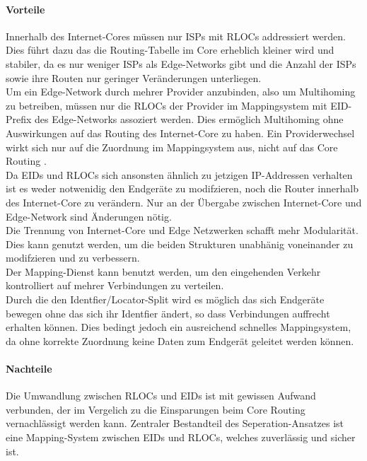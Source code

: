 \paragraph{Vorteile}
Innerhalb des Internet-Cores müssen nur ISPs mit RLOCs addressiert werden. Dies führt dazu das die Routing-Tabelle im Core erheblich kleiner wird und stabiler, da es nur weniger ISPs als Edge-Networks gibt und die Anzahl der ISPs sowie ihre Routen nur geringer Veränderungen unterliegen. \cite{jen:2008:start} \cite{deering:1996:map} \\
Um ein Edge-Network durch mehrer Provider anzubinden, also um Multihoming zu betreiben, müssen nur die RLOCs der Provider im Mappingsystem mit EID-Prefix des Edge-Networks assoziert werden. Dies ermöglich Multihoming ohne Auswirkungen auf das Routing des Internet-Core zu haben. Ein Providerwechsel wirkt sich nur auf die Zuordnung im  Mappingsystem aus, nicht auf das Core Routing \cite{farinacci2007internet}.\\
Da EIDs und RLOCs sich ansonsten ähnlich zu jetzigen IP-Addressen verhalten ist es weder notwenidig den Endgeräte zu modifzieren, noch die Router innerhalb des Internet-Core zu verändern. Nur an der Übergabe zwischen Internet-Core und Edge-Network sind Änderungen nötig. \cite{jen:2008:start} \\
Die Trennung von Internet-Core und Edge Netzwerken schafft mehr Modularität. Dies kann genutzt werden, um die beiden Strukturen unabhänig voneinander zu modifzieren und zu verbessern.\\
Der Mapping-Dienst kann benutzt werden, um den eingehenden Verkehr kontrolliert auf mehrer Verbindungen zu verteilen. \\
Durch die den Identfier/Locator-Split wird es möglich das sich Endgeräte bewegen ohne das sich ihr Identfier ändert, so dass Verbindungen auffrecht erhalten können. Dies bedingt jedoch ein ausreichend schnelles Mappingsystem, da ohne korrekte Zuordnung keine Daten zum Endgerät geleitet werden können. \\

\paragraph{Nachteile}
Die Umwandlung zwischen RLOCs und EIDs ist mit gewissen Aufwand verbunden, der im Vergelich zu die Einsparungen beim Core Routing vernachlässigt werden kann. Zentraler Bestandteil des Seperation-Ansatzes ist eine Mapping-System zwischen EIDs und RLOCs, welches zuverlässig und sicher ist. 

